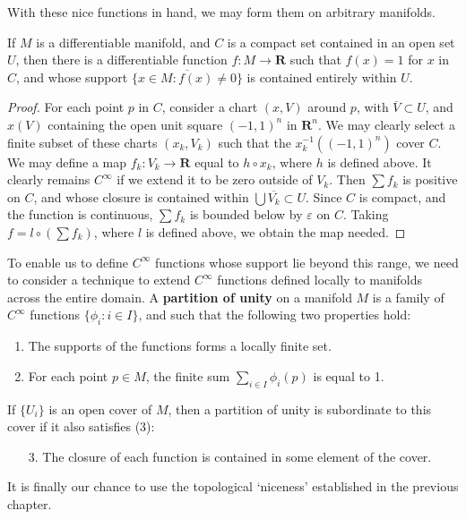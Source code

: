 With these nice functions in hand, we may form them on arbitrary manifolds.

\begin{theorem}
    If $M$ is a differentiable manifold, and $C$ is a compact set contained in an open set $U$, then there is a differentiable function $f:M \to \mathbf{R}$ such that $f(x) = 1$ for $x$ in $C$, and whose support $\overline{\{ x \in M : f(x) \neq 0 \}}$ is contained entirely within $U$.
\end{theorem}
\begin{proof}
    For each point $p$ in $C$, consider a chart $(x,V)$ around $p$, with $\overline{V} \subset U$, and $x(V)$ containing the open unit square $(-1,1)^n$ in $\mathbf{R}^n$. We may clearly select a finite subset of these charts $(x_k,V_k)$ such that the $x_k^{-1}((-1,1)^n)$ cover $C$. We may define a map $f_k:V_k \to \mathbf{R}$ equal to $h \circ x_k$, where $h$ is defined above. It clearly remains $C^\infty$ if we extend it to be zero outside of $V_k$. Then $\sum f_k$ is positive on $C$, and whose closure is contained within $\bigcup \overline{V_k} \subset U$. Since $C$ is compact, and the function is continuous, $\sum f_k$ is bounded below by $\varepsilon$ on $C$. Taking $f = l \circ (\sum f_k)$, where $l$ is defined above, we obtain the map needed.
\end{proof}

To enable us to define $C^\infty$ functions whose support lie beyond this range, we need to consider a technique to extend $C^\infty$ functions defined locally to manifolds across the entire domain. A {\bf partition of unity} on a manifold $M$ is a family of $C^\infty$ functions $\{ \phi_i : i \in I \}$, and such that the following two properties hold:
%
\begin{enumerate}
    \item The supports of the functions forms a locally finite set.
    \item For each point $p \in M$, the finite sum $\sum_{i \in I} \phi_i(p)$ is equal to 1.
\end{enumerate}
%
If $\{ U_i \}$ is an open cover of $M$, then a partition of unity is subordinate to this cover if it also satisfies (3):
%
\begin{enumerate}
    \item[3.] The closure of each function is contained in some element of the cover.
\end{enumerate}
%
It is finally our chance to use the topological `niceness' established in the previous chapter.

